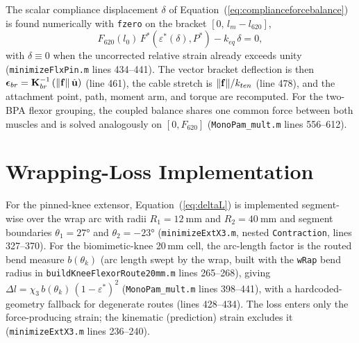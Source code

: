 The scalar compliance displacement $\delta$ of Equation~(\ref{eq:complianceforcebalance}) is found numerically with \texttt{fzero} on the bracket $[0,\, l_{m}-l_{620}]$,
\begin{equation}
    F_{620}(l_{0})\,F^{*}\!\left(\varepsilon^{*}(\delta),P^{*}\right) - k_{eq}\,\delta = 0,
    \label{eq:app_forcebalance}
\end{equation}
with $\delta \equiv 0$ when the uncorrected relative strain already exceeds unity (\texttt{minimizeFlxPin.m} lines 434--441). The vector bracket deflection is then $\boldsymbol{\epsilon}_{br} = \mathbf{K}_{br}^{-1}\left(\lVert\mathbf{f}\rVert\,\hat{\mathbf{u}}\right)$ (line 461), the cable stretch is $\lVert\mathbf{f}\rVert/k_{ten}$ (line 478), and the attachment point, path, moment arm, and torque are recomputed. For the two-BPA flexor grouping, the coupled balance shares one common force between both muscles and is solved analogously on $[0, F_{620}]$ (\texttt{MonoPam\_mult.m} lines 556--612).

\section{Wrapping-Loss Implementation}

For the pinned-knee extensor, Equation~(\ref{eq:deltaL}) is implemented segment-wise over the wrap arc with radii $R_1 = \qty{12}{\mm}$ and $R_2 = \qty{40}{\mm}$ and segment boundaries $\theta_{1} = \ang{27}$ and $\theta_{2} = \ang{-23}$ (\texttt{minimizeExtX3.m}, nested \texttt{Contraction}, lines 327--370). For the biomimetic-knee 20\,mm cell, the arc-length factor is the routed bend measure $b(\theta_{k})$ (arc length swept by the wrap, built with the \texttt{wRap} bend radius in \texttt{buildKneeFlexorRoute20mm.m} lines 265--268), giving $\Delta l = \chi_{3}\, b(\theta_{k})\,(1-\varepsilon^{*})^{2}$ (\texttt{MonoPam\_mult.m} lines 398--441), with a hardcoded-geometry fallback for degenerate routes (lines 428--434). The loss enters only the force-producing strain; the kinematic (prediction) strain excludes it (\texttt{minimizeExtX3.m} lines 236--240).


